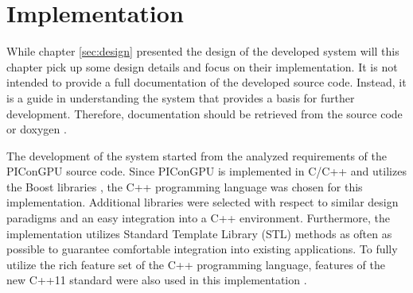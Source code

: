 \chapter{Implementation}
\label{sec:implementation}


While chapter \ref{sec:design} presented the design of the developed
system will this chapter pick up some design details and focus on
their implementation.  It is not intended to provide a full
documentation of the developed source code. Instead, it is a
guide in understanding the system that provides a basis for further
development. Therefore, documentation should be retrieved from the
source code or doxygen \cite{ref:doxygen}.

The development of the system started from the analyzed requirements
of the PIConGPU source code. Since PIConGPU is implemented in C/C++
and utilizes the Boost libraries \cite{ref:boost},
the C++ programming language was chosen for this
implementation. Additional libraries were selected with respect to
similar design paradigms and an easy integration into a C++
environment. Furthermore, the implementation utilizes Standard
Template Library (STL) methods as often as possible to guarantee
comfortable integration into existing applications.  To fully utilize
the rich feature set of the C++ programming language, features of the
new C++11 standard were also used in this implementation
\cite{ref:c++11}.

